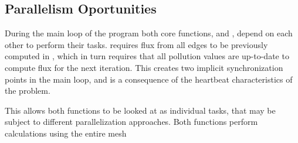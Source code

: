 \subsection{Parallelism Oportunities}

During the main loop of the program both core functions, \computeflux and \update, depend on each other to perform their tasks. \update requires flux from all edges to be previously computed in \computeflux, which in turn requires that all pollution values are up-to-date to compute flux for the next iteration. This creates two implicit synchronization points in the main loop, and is a consequence of the heartbeat characteristics of the problem.

This allows both functions to be looked at as individual tasks, that may be subject to different parallelization approaches.
Both functions perform calculations using the entire mesh
